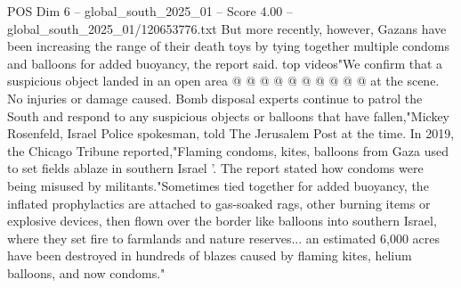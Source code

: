 \begin{textsample}{POS Dim 6 – global\_south\_2025\_01 – Score 4.00 – global\_south\_2025\_01/120653776.txt}
But more recently, however, Gazans have been increasing the range of their death toys by tying together multiple condoms and balloons for added buoyancy, the report said. top videos"We confirm that a suspicious object landed in an open area @ @ @ @ @ @ @ @ @ @ at the scene.
No injuries or damage caused.
Bomb disposal experts continue to patrol the South and respond to any suspicious objects or balloons that have fallen,"Mickey Rosenfeld, Israel Police spokesman, told The Jerusalem Post at the time.
In 2019, the Chicago Tribune reported,"Flaming condoms, kites, balloons from Gaza used to set fields ablaze in southern Israel '.
The report stated how condoms were being misused by militants."Sometimes tied together for added buoyancy, the inflated prophylactics are attached to gas-soaked rags, other burning items or explosive devices, then flown over the border like balloons into southern Israel, where they set fire to farmlands and nature reserves... an estimated 6,000 acres have been destroyed in hundreds of blazes caused by flaming kites, helium balloons, and now condoms."

\end{textsample}
